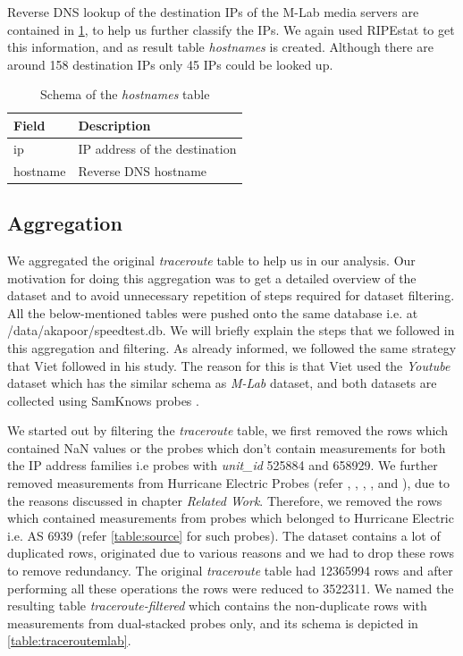 \FloatBarrier

Reverse DNS lookup of the destination IPs of the M-Lab media servers are contained in \cref{table:hostnamesmlab}, to help us further classify the IPs. We again used RIPEstat \cite{ripestat} to get this information, and as result table \textit{hostnames} is created. Although there are around 158 destination IPs only 45 IPs could be looked up.

\begin{table}[!h]
	\centering
	\caption{Schema of the \textit{hostnames} table}
	\label{table:hostnamesmlab}
	\begin{tabular}{lp{7cm}}
  		\toprule
  		\textbf{Field} & \textbf{Description} \\ 
  		\midrule
  		ip & IP address of the destination \\
  		hostname & Reverse DNS hostname \\
  		\bottomrule
\end{tabular}
\end{table}

\FloatBarrier

\subsection*{Aggregation}

We aggregated the original \textit{traceroute} table to help us in our analysis. Our motivation for doing this aggregation was to get a detailed overview of the dataset and to avoid unnecessary repetition of steps required for dataset filtering. All the below-mentioned tables were pushed onto the same database i.e. at /data/akapoor/speedtest.db. We will briefly explain the steps that we followed in this aggregation and filtering. As already informed, we followed the same strategy that Viet \cite{viet} followed in his study. The reason for this is that Viet used the \textit{Youtube} dataset which has the similar schema as \textit{M-Lab} dataset, and both datasets are collected using SamKnows probes \cite{samknows}. 


We started out by filtering the \textit{traceroute} table, we first removed the rows which contained NaN values or the probes which don't contain measurements for both the IP address families i.e probes with \textit{unit\_id} 525884 and 658929. We further removed measurements from Hurricane Electric Probes (refer \cite{he1}, \cite{he2}, \cite{he3}, \cite{he4}, and \cite{he5}), due to the reasons discussed in chapter \textit{Related Work}. Therefore, we removed the rows which contained measurements from probes which belonged to Hurricane Electric i.e. AS 6939 (refer \cref{table:source} for such probes). The dataset contains a lot of duplicated rows, originated due to various reasons and we had to drop these rows to remove redundancy. The original \textit{traceroute} table had 12365994 rows and after performing all these operations the rows were reduced to 3522311. We named the resulting table \textit{traceroute-filtered} which contains the non-duplicate rows with measurements from dual-stacked probes only, and its schema is depicted in \cref{table:traceroutemlab}. 


